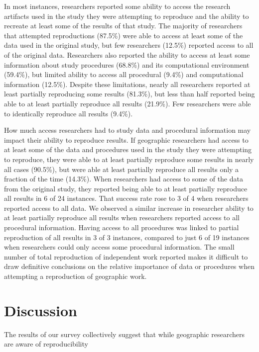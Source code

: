 \documentclass[]{interact}
\theoremstyle{plain}%
\theoremstyle{definition}
\theoremstyle{remark}
\begin{document}
In most instances, researchers reported some ability to access the research artifacts used in the study they were attempting to reproduce and the ability to recreate at least some of the results of that study.  
The majority of researchers that attempted reproductions (87.5\%) were able to access at least some of the data used in the original study, but few researchers (12.5\%) reported access to all of the original data.
Researchers also reported the ability to access at least some information about study procedures (68.8\%) and its computational environment (59.4\%), but limited ability to access all procedural (9.4\%) and computational information (12.5\%). 
Despite these limitations, nearly all researchers reported at least partially reproducing some results (81.3\%), but less than half reported being able to at least partially reproduce all results (21.9\%).
Few researchers were able to identically reproduce all results (9.4\%).  

How much access researchers had to study data and procedural information may impact their ability to reproduce results. 
If geographic researchers had access to at least some of the data and procedures used in the study they were attempting to reproduce, they were able to at least partially reproduce some results in nearly all cases (90.5\%), but were able at least partially reproduce all results only a fraction of the time (14.3\%).
When researchers had access to some of the data from the original study, they reported being able to at least partially reproduce all results in 6 of 24 instances. 
That success rate rose to 3 of 4 when researchers reported access to all data. 
We observed a similar increase in researcher ability to at least partially reproduce all results when researchers reported access to all procedural information. 
Having access to all procedures was linked to partial reproduction of all results in 3 of 3 instances, compared to just 6 of 19 instances when researchers could only access some procedural information. 
The small number of total reproduction of independent work reported makes it difficult to draw definitive conclusions on the relative importance of data or procedures when attempting a reproduction of geographic work.


\section*{Discussion}
The results of our survey collectively suggest that while geographic researchers are aware of reproducibility 
\end{document}
